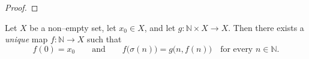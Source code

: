 \begin{proof}
	
	
	
	
	

\end{proof}
\fi 



\iffalse 

\begin{theorem}\label{thm:recursion}
	Let $X$ be a non–empty set, let $x_{0}\in X$, and let 
	\(g:\mathbb{N}\times X\longrightarrow X\).
	Then there exists a \emph{unique} map
	\(f:\mathbb{N}\longrightarrow X\) such that
	\[
	f(0)=x_{0}\qquad\text{and}\qquad 
	f\!\bigl(\sigma(n)\bigr)=g\bigl(n,f(n)\bigr)
	\quad\text{for every }n\in\mathbb{N}.
	\]
\end{theorem}

